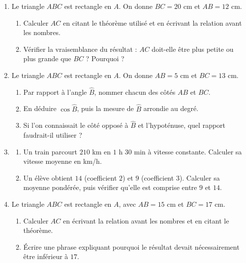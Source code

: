 \documentclass[10pt,a4paper]{article}
\begin{document}
\begin{enumerate}
\needspace{22mm}
\item[\textbf{B1.}] Le triangle $ABC$ est rectangle en $A$. On donne $BC = 20$ cm et $AB = 12$ cm.
\begin{enumerate}
\item Calculer $AC$ en citant le théorème utilisé et en écrivant la relation avant les nombres.
\item Vérifier la vraisemblance du résultat : $AC$ doit-elle être plus petite ou plus grande que $BC$ ? Pourquoi ?
\end{enumerate}
\par\vspace{1.2mm}
\needspace{22mm}
\item[\textbf{B2.}] Le triangle $ABC$ est rectangle en $A$. On donne $AB = 5$ cm et $BC = 13$ cm.
\begin{enumerate}
\item Par rapport à l'angle $\widehat{B}$, nommer chacun des côtés $AB$ et $BC$.
\item En déduire $\cos\widehat{B}$, puis la mesure de $\widehat{B}$ arrondie au degré.
\item Si l'on connaissait le côté opposé à $\widehat{B}$ et l'hypoténuse, quel rapport faudrait-il utiliser ?
\end{enumerate}
\par\vspace{1.2mm}
\needspace{22mm}
\item[\textbf{B3.}] \begin{enumerate}
\item Un train parcourt $210$ km en $1$ h $30$ min à vitesse constante. Calculer sa vitesse moyenne en km/h.
\item Un élève obtient $14$ (coefficient $2$) et $9$ (coefficient $3$). Calculer sa moyenne pondérée, puis vérifier
qu'elle est comprise entre $9$ et $14$.
\end{enumerate}
\par\vspace{1.2mm}
\needspace{22mm}
\item[\textbf{B4.}] Le triangle $ABC$ est rectangle en $A$, avec $AB = 15$ cm et $BC = 17$ cm.
\begin{enumerate}
\item Calculer $AC$ en écrivant la relation avant les nombres et en citant le théorème.
\item Écrire une phrase expliquant pourquoi le résultat devait nécessairement être inférieur à $17$.
\end{enumerate}
\par\vspace{1.2mm}
\end{enumerate}
\end{document}
